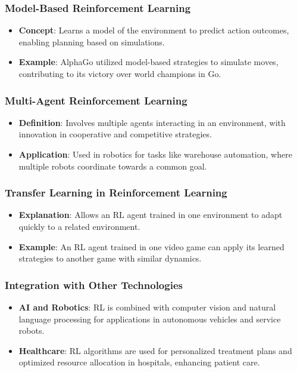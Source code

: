 \documentclass{beamer}
\begin{document}
\begin{frame}[fragile]
    \frametitle{Model-Based Reinforcement Learning}
    \begin{itemize}
        \item \textbf{Concept}: Learns a model of the environment to predict action outcomes, enabling planning based on simulations.
        \item \textbf{Example}: AlphaGo utilized model-based strategies to simulate moves, contributing to its victory over world champions in Go.
    \end{itemize}
\end{frame}

\begin{frame}[fragile]
    \frametitle{Multi-Agent Reinforcement Learning}
    \begin{itemize}
        \item \textbf{Definition}: Involves multiple agents interacting in an environment, with innovation in cooperative and competitive strategies.
        \item \textbf{Application}: Used in robotics for tasks like warehouse automation, where multiple robots coordinate towards a common goal.
    \end{itemize}
\end{frame}

\begin{frame}[fragile]
    \frametitle{Transfer Learning in Reinforcement Learning}
    \begin{itemize}
        \item \textbf{Explanation}: Allows an RL agent trained in one environment to adapt quickly to a related environment.
        \item \textbf{Example}: An RL agent trained in one video game can apply its learned strategies to another game with similar dynamics.
    \end{itemize}
\end{frame}

\begin{frame}[fragile]
    \frametitle{Integration with Other Technologies}
    \begin{itemize}
        \item \textbf{AI and Robotics}: RL is combined with computer vision and natural language processing for applications in autonomous vehicles and service robots.
        \item \textbf{Healthcare}: RL algorithms are used for personalized treatment plans and optimized resource allocation in hospitals, enhancing patient care.
    \end{itemize}
\end{frame}
\end{document}
